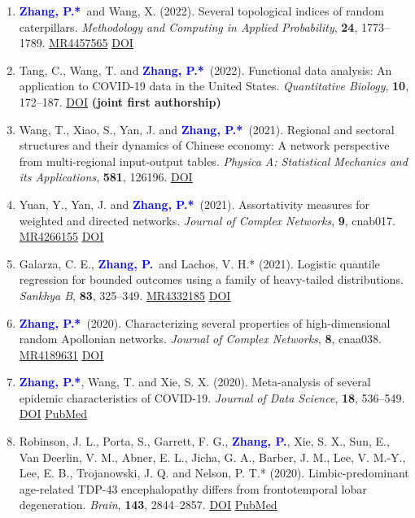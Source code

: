 \documentclass{res}
\def\MR#1{\href{http://www.ams.org/mathscinet-getitem?mr=#1}{MR#1}}
\newcommand{\PZ}{\textbf{\textcolor{blue}{Zhang, P.*}}}
\newcommand{\PZnot}{\textbf{\textcolor{blue}{Zhang, P.}}}
\begin{document}
\begin{resume}
\begin{enumerate}
	\item \PZ\ and {\sc Wang, X.} (2022). Several 
	topological indices of random caterpillars. 
	{\em Methodology and Computing in Applied Probability}, {\bf 
	24}, 1773--1789. \MR{4457565} 
	\href{https://doi.org/10.1007/s11009-021-09895-1}
	{\underline{DOI}} 
	
	\item {\sc Tang, C., Wang, T.} and \PZ\ (2022). 
	Functional data analysis: An application to COVID-19 data in
	the United States. {\em Quantitative Biology}, {\bf 10}, 
	172--187.
	\href{https://doi.org/10.15302/J-QB-022-0300}
	{\underline{DOI}} {\bf \small (joint first authorship)}
	
	\item {\sc Wang, T., Xiao, S., Yan, J.} and \PZ\ 
	(2021). Regional and sectoral structures and their dynamics of
	Chinese economy: A network perspective from
	multi-regional input-output tables. {\em Physica A: Statistical 
	Mechanics and its Applications}, {\bf 581}, 126196.
	\href{https://doi.org/10.1016/j.physa.2021.126196}
	{\underline{DOI}}
	
	\item {\sc Yuan, Y., Yan, J.} and \PZ\ (2021). 
	Assortativity measures for weighted and directed
	networks. \emph{Journal of Complex Networks}, {\bf 9}, cnab017. 
	\MR{4266155} \href{https://doi.org/10.1093/comnet/cnab017}
	{\underline{DOI}}
	
	\item {\sc Galarza, C. E.}, \PZnot\	and {\sc Lachos, V. H.*} 
	(2021). Logistic quantile regression for bounded outcomes using 
	a family of heavy-tailed distributions. {\em Sankhya B}, {\bf 
	83}, 325--349. \MR{4332185} 
	\href{https://doi.org/10.1007/s13571-020-00231-0}
	{\underline{DOI}}
	
	\item \PZ\ (2020). Characterizing several properties of 
	high-dimensional random Apollonian networks. {\em 
	Journal of Complex Networks}, {\bf 8}, cnaa038. \MR{4189631}
	\href{https://doi.org/10.1093/comnet/cnaa038}
	{\underline{DOI}}
	
	\item \PZ, {\sc Wang, T.} and {\sc Xie, S. X.} 
	(2020). Meta-analysis of several epidemic characteristics of 
	COVID-19. {\em Journal of Data Science}, {\bf 18}, 536--549. 
	\href{https://doi.org/10.6339/JDS.202007_18(3).0019}
	{\underline{DOI}}
	\href{https://pubmed.ncbi.nlm.nih.gov/33088292}
	{\underline{PubMed}}
	
	\item {\sc Robinson, J. L., Porta, S., Garrett, F. G.}, 
	\PZnot, {\sc Xie, S. X., Sun, E., 
	Van Deerlin, V. M., Abner, 
	E. L., Jicha, G. A., Barber, J. M., Lee, V. M.-Y., Lee, E. B., 
	Trojanowski, J. Q.} and {\sc Nelson, P. T.*} (2020). 
	Limbic-predominant age-related TDP-43 encephalopathy differs 
	from frontotemporal lobar degeneration. {\em Brain}, {\bf 143}, 
	2844--2857. 
	\href{https://doi.org/10.1093/brain/awaa219}
	{\underline{DOI}}
	\href{https://pubmed.ncbi.nlm.nih.gov/32830216}
	{\underline{PubMed}}
		

\end{enumerate}
\end{resume}
\end{document}
